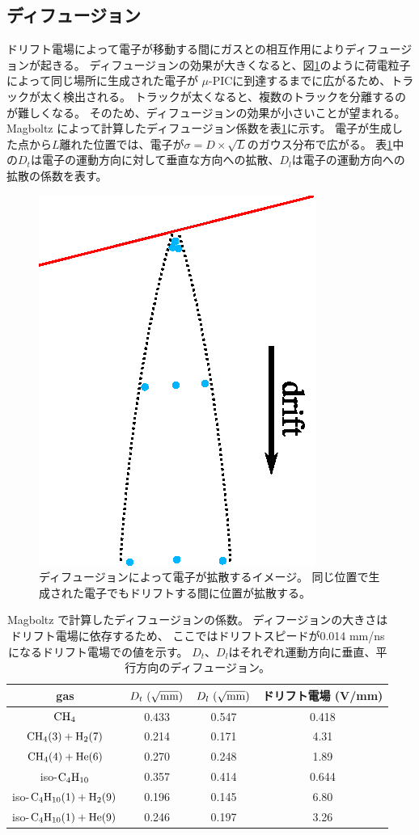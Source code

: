 \subsection{ディフュージョン}
ドリフト電場によって電子が移動する間にガスとの相互作用によりディフュージョンが起きる。
ディフュージョンの効果が大きくなると、図\ref{fig::diffusion-image}のように荷電粒子によって同じ場所に生成された電子が
$\mu$-PICに到達するまでに広がるため、トラックが太く検出される。
トラックが太くなると、複数のトラックを分離するのが難しくなる。
そのため、ディフュージョンの効果が小さいことが望まれる。
Magboltz によって計算したディフュージョン係数を表\ref{tab::diffusion}に示す。
電子が生成した点から$L$離れた位置では、電子が$\sigma = D\times\sqrt{L}$のガウス分布で広がる。
表\ref{tab::diffusion}中の$D_{t}$は電子の運動方向に対して垂直な方向への拡散、$D_{l}$は電子の運動方向への拡散の係数を表す。
\begin{figure}
  \centering
  \includegraphics[clip, width=0.4\columnwidth]{eps/diffusion_image.eps}
  \caption[ディフュージョンによって電子が拡散するイメージ。]
          {ディフュージョンによって電子が拡散するイメージ。
          同じ位置で生成された電子でもドリフトする間に位置が拡散する。}
  \label{fig::diffusion-image}
\end{figure}
\begin{table}
  \centering
  \caption[Magboltz で計算したディフュージョンの係数。]
          {Magboltz で計算したディフュージョンの係数。
            ディフージョンの大きさはドリフト電場に依存するため、
            ここではドリフトスピードが0.014 mm/ns になるドリフト電場での値を示す。
          $D_{t}$、$D_{l}$はそれぞれ運動方向に垂直、平行方向のディフュージョン。}
  \label{tab::diffusion}
  \begin{tabular}{cccc}
    \toprule
    gas & $D_{t}~(\sqrt{\rm mm})$ & $D_{l}~(\sqrt{\rm mm})$ & ドリフト電場 (V/mm) \\
    \midrule
    ${\rm CH_{4}}$ & 0.433 & 0.547 & 0.418\\
    ${\rm CH_{4} (3) + H_{2} (7)}$ & 0.214 & 0.171 & 4.31\\
    ${\rm CH_{4} (4) + He (6)}$ & 0.270  & 0.248 & 1.89\\
    iso-${\rm C_{4}H_{10}}$ & 0.357 & 0.414 & 0.644\\
    iso-${\rm C_{4}H_{10} (1) + H_{2}} (9)$ & 0.196 & 0.145 & 6.80\\
    iso-${\rm C_{4}H_{10} (1) + He} (9) $ & 0.246 & 0.197 & 3.26\\
    \bottomrule
  \end{tabular}
\end{table}

